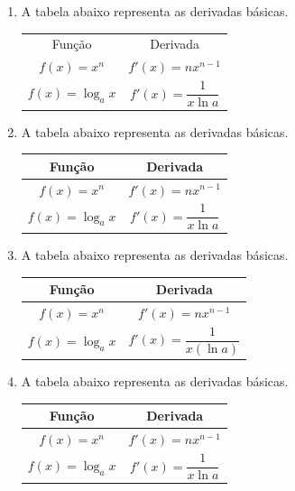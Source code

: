 \documentclass[a4paper, 12pt]{article}
\begin{document}
\begin{enumerate}
    \item A tabela abaixo representa as derivadas básicas.
    
    \begin{tabular}{cc} %
    
    Função & Derivada\\
    $f(x) = x^n$     & $f'(x) = nx^{n-1}$ \\
    $f(x) = \log_a x$ & $f'(x) = \dfrac{1}{x \ln a}$
    \end{tabular}
    
    \item A tabela abaixo representa as derivadas básicas.

    \begin{tabular}{|c|c|} %
    
    \hline %
    
    Função & Derivada\\ \hline 
    $f(x) = x^n$     & $f'(x) = nx^{n-1}$ \\ \hline
    $f(x) = \log_a x$ & $f'(x) = \dfrac{1}{x \ln a}$ \\ \hline
    \end{tabular}
    
    \item A tabela abaixo representa as derivadas básicas.

    \begin{tabular}{c||c} 
    \hline 
    Função & Derivada\\ \hline \hline 
    $f(x) = x^n$     & $f'(x) = nx^{n-1}$ \\ \hline \hline
    $f(x) = \log_a x$ & $f'(x) = \dfrac{1}{x (\ln a)}$ \\ \hline
    \end{tabular}
    
    \item A tabela abaixo representa as derivadas básicas.

    
    \begin{center} %
        
        \begin{tabular}{c||c} 
        \hline 
        Função & Derivada\\ \hline \hline 
        $f(x) = x^n$     & $f'(x) = nx^{n-1}$ \\ \hline \hline
        $f(x) = \log_a x$ & $f'(x) = \dfrac{1}{x \ln a}$ \\ \hline
        \end{tabular}
        

\end{center}
\end{enumerate}
\end{document}
